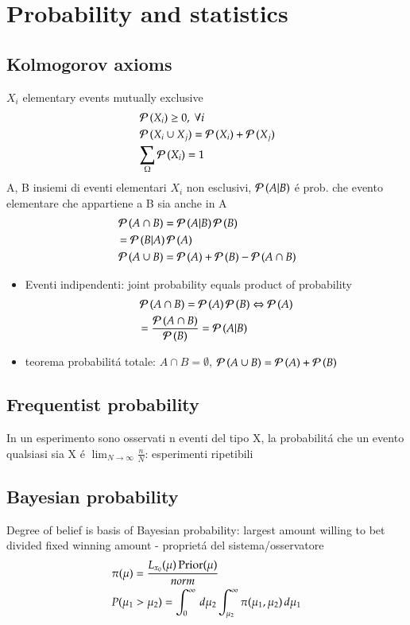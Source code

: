 \documentclass[main.tex]{subfiles}
\begin{document}
\chapter{Probability and statistics}
\PartialToc

\section{Kolmogorov axioms}
$X_i$ elementary events mutually exclusive
\begin{align*}
&\operatorname{\mathcal{P}}{(X_i)}\geq0,\ \forall i\\
&\operatorname{\mathcal{P}}{(X_i\cup X_j)}=\operatorname{\mathcal{P}}{(X_i)}+\operatorname{\mathcal{P}}{(X_j)}\\
&\sum_{\Omega}\operatorname{\mathcal{P}}{(X_i)}=1
\end{align*}
A, B insiemi di eventi elementari $X_i$ non esclusivi, $\operatorname{\mathcal{P}}{(A|B)}$ \'e prob. che evento elementare che appartiene a B sia anche in A
\begin{align*}
&\operatorname{\mathcal{P}}{(A\cap B)}=\operatorname{\mathcal{P}}{(A|B)}\operatorname{\mathcal{P}}{(B)}\\
&=\operatorname{\mathcal{P}}{(B|A)}\operatorname{\mathcal{P}}{(A)}\\
&\operatorname{\mathcal{P}}{(A\cup B)}=\operatorname{\mathcal{P}}{(A)}+\operatorname{\mathcal{P}}{(B)}-\operatorname{\mathcal{P}}{(A\cap B)} 
\end{align*}
\begin{itemize}
\item Eventi indipendenti: joint probability equals product of probability
\begin{align*}
&\operatorname{\mathcal{P}}{(A\cap B)}=\operatorname{\mathcal{P}}{(A)}\operatorname{\mathcal{P}}{(B)}\Leftrightarrow \operatorname{\mathcal{P}}{(A)}\\
&=\frac{\operatorname{\mathcal{P}}{(A\cap B)}}{\operatorname{\mathcal{P}}{(B)}}=\operatorname{\mathcal{P}}{(A|B)}
\end{align*}
\item teorema probabilit\'a totale: $A\cap B=\emptyset$, $\operatorname{\mathcal{P}}{(A\cup B)}=\operatorname{\mathcal{P}}{(A)}+\operatorname{\mathcal{P}}{(B)}$
\end{itemize}

\section{Frequentist probability}

In un esperimento sono osservati n eventi del tipo X, la probabilit\'a che un evento qualsiasi sia X \'e $\lim_{N\to\infty}\frac{n}{N}$: esperimenti ripetibili

\section{Bayesian probability}

Degree of belief is basis of Bayesian probability: largest amount willing to bet divided fixed winning amount - propriet\'a del sistema/osservatore
\begin{align*}
&\pi(\mu)=\frac{L_{x_0}(\mu)\operatorname{Prior}(\mu)}{norm}\\
&P(\mu_1>\mu_2)=\int_0^{\infty}\,d\mu_2\int_{\mu_2}^{\infty}\pi(\mu_1,\mu_2)\,d\mu_1
\end{align*}
\end{document}

